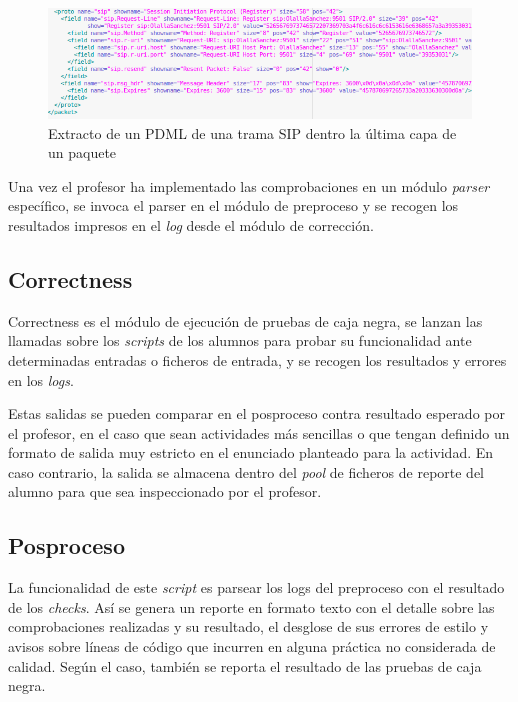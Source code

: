 \begin{figure}[H]
   \centering
   \includegraphics[width=16cm]{img/Selection_015_pdml_2}
   \caption{Extracto de un PDML de una trama SIP dentro la última capa de un paquete}
   \label{figura:extracto_pdml}
\end{figure}


Una vez el profesor ha implementado las comprobaciones en un módulo \textit{parser} específico, se invoca el parser en el módulo de preproceso y se recogen los resultados impresos en el \textit{log} desde el módulo de corrección.


\subsection{Correctness}
\label{sec:correctness}


Correctness es el módulo de ejecución de pruebas de caja negra, se lanzan las llamadas sobre los \textit{scripts} de los alumnos para probar su funcionalidad ante determinadas entradas o ficheros de entrada, y se recogen los resultados y errores en los \textit{logs}.


Estas salidas se pueden comparar en el posproceso contra resultado esperado por el profesor, en el caso que sean actividades más sencillas o que tengan definido un formato de salida muy estricto en el enunciado planteado para la actividad. En caso contrario, la salida se almacena dentro del \textit{pool} de ficheros de reporte del alumno para que sea inspeccionado por el profesor.


\subsection{Posproceso}
\label{sec:posproceso}


La funcionalidad de este \textit{script} es parsear los logs del preproceso con el resultado de los \textit{checks}. Así se genera un reporte en formato texto con el detalle sobre las comprobaciones realizadas y su resultado, el desglose de sus errores de estilo y avisos sobre líneas de código que incurren en alguna práctica no considerada de calidad. Según el caso, también se reporta el resultado de las pruebas de caja negra.


